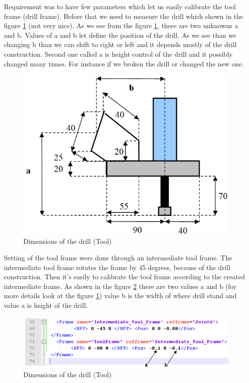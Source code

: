 Requirement was to have few parameters which let us easily calibrate the tool frame (drill frame). Before that we need to measure the drill which shown in the figure \ref{fig:drillDimensions} (not very nice). As we see from the figure \ref{fig:drillDimensions}, there are two unknowns a and b. Values of a and b let define the position of the drill. As we see than we changing b than we can shift to right or left and it depends mostly of the drill construction. Second one called a is height control of the drill and it possibly changed many times. For instance if we broken the drill or changed the new one. 

\begin{figure}[H]
  \centering
  \includegraphics[scale= 0.6]{source/drillDimensions.png}
  \caption{Dimensions of the drill (Tool)}
  \label{fig:drillDimensions}
\end{figure}

Setting of the tool frame were done through an intermediate tool frame. The intermediate tool frame rotates the frame by 45 degrees, because of the drill construction.  Then it's easily to calibrate the tool frame according to the created intermediate frame. As shown in the figure \ref{fig:toolCalibrationXML} there are two values a and b (for more details look at the figure \ref{fig:drillDimensions}) value b is the width of where drill stand and value a is height of the drill.

\begin{figure}[H]
  \centering
  \includegraphics[scale= 0.6]{source/toolCalibrationXML.png}
  \caption{Dimensions of the drill (Tool)}
  \label{fig:toolCalibrationXML}
\end{figure}

